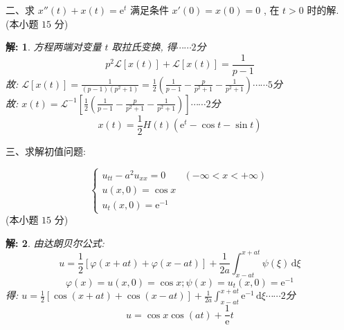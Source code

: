 \documentclass{article}
\theoremstyle{nonumberplain}
\newtheorem{solution}{\textcolor{gr}{解:}}
\newcommand{\dd}{\,\mathrm{d}}
\newcommand{\ee}{\mathrm{e}}
\newcommand{\LL}{\mathscr{L}}
\begin{document}
    \begin{flushleft}
    	二、求 $x''(t)+x(t)=\ee^t$ 满足条件 $x'(0)=x(0)=0$ , 在 $t>0$ 时的解. (本小题 $15$ 分)
    \end{flushleft}
    \begin{solution}
    	方程两端对变量 $t$ 取拉氏变换, 得\hfill$\cdots\cdots2$分
    	\begin{equation*}
    		p^2 \LL[x(t)]+\LL[x(t)]=\frac{1}{p-1}\tag*{$\cdots\cdots3$分}
    	\end{equation*}
    	故: $\LL[x(t)]=\frac{1}{(p-1)\left(p^2+1\right)}=\frac{1}{2}\left( \frac{1}{p-1}-\frac{p}{p^2+1}-\frac{1}{p^2+1} \right)$\hfill$\cdots\cdots5$分\\
    	故: $x(t)=\LL^{-1}\left[ \frac{1}{2}\left( \frac{1}{p-1}-\frac{p}{p^2+1}-\frac{1}{p^2+1} \right) \right]$\hfill$\cdots\cdots2$分
    	\begin{equation*}
    		x(t)=\frac{1}{2}H(t)\left( \ee^t-\cos t-\sin t \right)\tag*{$\cdots\cdots3$分}
    	\end{equation*}
    \end{solution}
    
    \begin{flushleft}
    	三、求解初值问题:
    \end{flushleft}
    \begin{equation*}
    \begin{cases}
    u_{tt}-a^2u_{xx}=0 & (-\infty<x<+\infty)\\
    u(x,0)=\cos x\\
    u_{t}(x,0)=\ee^{-1}
    \end{cases}
    \end{equation*}
    (本小题 $15$ 分)
    \begin{solution}
    	由达朗贝尔公式:
    	\begin{equation*}
    	u=\frac{1}{2}[\varphi(x+at)+\varphi(x-at)]+\frac{1}{2a}\int_{x-at}^{x+at}\psi(\xi)\dd\xi\tag*{$\cdots\cdots5$分}
    	\end{equation*}
    	\begin{equation*}
    		\varphi(x)=u(x,0)=\cos x;\psi(x)=u_{t}(x,0)=\ee^{-1}\tag*{$\cdots\cdots3$分}
    	\end{equation*}
    	得: $u=\frac{1}{2}[\cos(x+at)+\cos(x-at)]+\frac{1}{2a}\int_{x-at}^{x+at}\ee^{-1}\dd\xi$\hfill$\cdots\cdots2$分
    	\begin{equation*}
    		u=\cos x\cos(at)+\frac{1}{\ee}t\tag*{$\cdots\cdots5$分}
    	\end{equation*}
    \end{solution}
    
\end{document}
